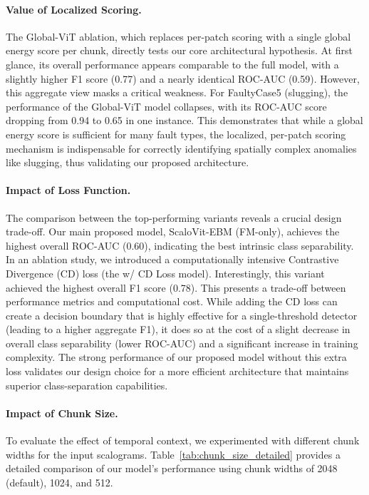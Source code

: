 \documentclass{article}
\begin{document}
\paragraph{Value of Localized Scoring.} The Global-ViT ablation, which replaces per-patch scoring with a single global energy score per chunk, directly tests our core architectural hypothesis. At first glance, its overall performance appears comparable to the full model, with a slightly higher F1 score (0.77) and a nearly identical ROC-AUC (0.59). However, this aggregate view masks a critical weakness. For FaultyCase5 (slugging), the performance of the Global-ViT model collapses, with its ROC-AUC score dropping from 0.94 to 0.65 in one instance. This demonstrates that while a global energy score is sufficient for many fault types, the localized, per-patch scoring mechanism is indispensable for correctly identifying spatially complex anomalies like slugging, thus validating our proposed architecture.

\paragraph{Impact of Loss Function.} The comparison between the top-performing variants reveals a crucial design trade-off. Our main proposed model, ScaloVit-EBM (FM-only), achieves the highest overall ROC-AUC (0.60), indicating the best intrinsic class separability. In an ablation study, we introduced a computationally intensive Contrastive Divergence (CD) loss (the w/ CD Loss model). Interestingly, this variant achieved the highest overall F1 score (0.78). This presents a trade-off between performance metrics and computational cost. While adding the CD loss can create a decision boundary that is highly effective for a single-threshold detector (leading to a higher aggregate F1), it does so at the cost of a slight decrease in overall class separability (lower ROC-AUC) and a significant increase in training complexity. The strong performance of our proposed model without this extra loss validates our design choice for a more efficient architecture that maintains superior class-separation capabilities.

\paragraph{Impact of Chunk Size.}\label{sec:chunk_size_analysis} 
To evaluate the effect of temporal context, we experimented with different chunk widths for the input scalograms. Table~\ref{tab:chunk_size_detailed} provides a detailed comparison of our model's performance using chunk widths of 2048 (default), 1024, and 512.
\end{document}
